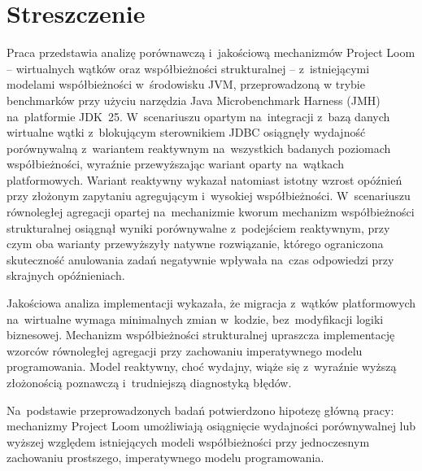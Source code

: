 



{}
\chapter*{Streszczenie}

Praca przedstawia analizę porównawczą i~jakościową mechanizmów Project Loom -- wirtualnych wątków oraz współbieżności strukturalnej -- z~istniejącymi modelami współbieżności w~środowisku JVM, przeprowadzoną w trybie benchmarków przy użyciu narzędzia Java Microbenchmark Harness (JMH) na~platformie JDK~25. W~scenariuszu opartym na~integracji z~bazą danych wirtualne wątki z~blokującym sterownikiem JDBC osiągnęły wydajność porównywalną z~wariantem reaktywnym na~wszystkich badanych poziomach współbieżności, wyraźnie przewyższając wariant oparty na~wątkach platformowych. Wariant reaktywny wykazał natomiast istotny wzrost opóźnień przy złożonym zapytaniu agregującym i~wysokiej współbieżności. W~scenariuszu równoległej agregacji opartej na~mechanizmie kworum mechanizm współbieżności strukturalnej osiągnął wyniki porównywalne z~podejściem reaktywnym, przy czym oba warianty przewyższyły natywne rozwiązanie, którego ograniczona skuteczność anulowania zadań negatywnie wpływała na~czas odpowiedzi przy skrajnych opóźnieniach.

Jakościowa analiza implementacji wykazała, że migracja z~wątków platformowych na~wirtualne wymaga minimalnych zmian w~kodzie, bez~modyfikacji logiki biznesowej. Mechanizm współbieżności strukturalnej upraszcza implementację wzorców równoległej agregacji przy zachowaniu imperatywnego modelu programowania. Model reaktywny, choć wydajny, wiąże się z~wyraźnie wyższą złożonością poznawczą i~trudniejszą diagnostyką błędów.

Na~podstawie przeprowadzonych badań potwierdzono hipotezę główną pracy: mechanizmy Project Loom umożliwiają osiągnięcie wydajności porównywalnej lub wyższej względem istniejących modeli współbieżności przy jednoczesnym zachowaniu prostszego, imperatywnego modelu programowania.

